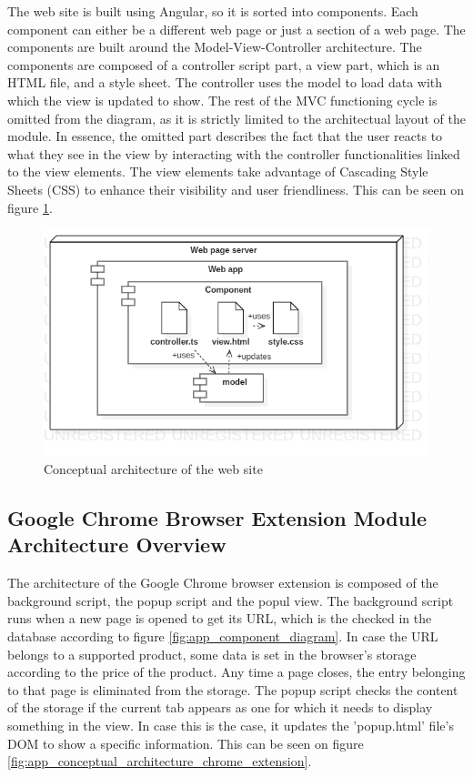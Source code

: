 \documentclass[12pt,a4paper,twoside]{report}
\begin{document}
The web site is built using Angular, so it is sorted into components. Each component can either be a different web page or just a section of a web page. The components are built around the Model-View-Controller architecture. The components are composed of a controller script part, a view part, which is an HTML file, and a style sheet. The controller uses the model to load data with which the view is updated to show. The rest of the MVC functioning cycle is omitted from the diagram, as it is strictly limited to the architectual layout of the module. In essence, the omitted part describes the fact that the user reacts to what they see in the view by interacting with the controller functionalities linked to the view elements. The view elements take advantage of Cascading Style Sheets (CSS) to enhance their visibility and user friendliness. This can be seen on figure \ref{fig:app_conceptual_architecture_site}.

\begin{figure}[ht]
  \centering
  \includegraphics[width=0.65\linewidth]{img/app_conceptual_architecture_site.png}
  \caption[]{Conceptual architecture of the web site}
  \label{fig:app_conceptual_architecture_site}
\end{figure}


\subsection{Google Chrome Browser Extension Module Architecture Overview}

The architecture of the Google Chrome browser extension is composed of the background script, the popup script and the popul view. The background script runs when a new page is opened to get its URL, which is the checked in the database according to figure \ref{fig:app_component_diagram}. In case the URL belongs to a supported product, some data is set in the browser's storage according to the price of the product. Any time a page closes, the entry belonging to that page is eliminated from the storage. The popup script checks the content of the storage if the current tab appears as one for which it needs to display something in the view. In case this is the case, it updates the 'popup.html' file's DOM to show a specific information. This can be seen on figure \ref{fig:app_conceptual_architecture_chrome_extension}.
\end{document}
